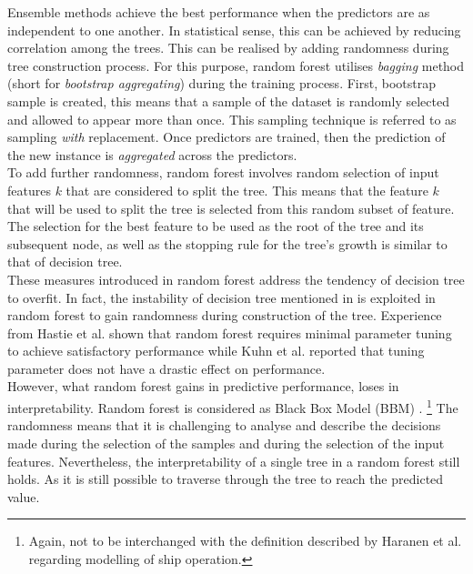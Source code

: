 Ensemble methods achieve the best performance when the predictors are as independent to one another. In statistical sense, this can be achieved by reducing correlation among the trees. This can be realised by adding randomness during tree construction process. For this purpose, random forest utilises \emph{bagging} \cite{Breiman.1996} method (short for \emph{bootstrap aggregating}) during the training process. First, bootstrap sample is created, this means that a sample of the dataset is randomly selected and allowed to appear more than once. This sampling technique is referred to as sampling \emph{with} replacement. Once predictors are trained, then the prediction of the new instance is \emph{aggregated} across the predictors. \cite{Kuhn.2013,Hastie.2009,Geron.2019}\\

To add further randomness, random forest involves random selection of input features $k$ that are considered to split the tree. This means that the feature $k$ that will be used to split the tree is selected from this random subset of feature. The selection for the best feature to be used as the root of the tree and its subsequent node, as well as the stopping rule for the tree's growth is similar to that of decision tree. \cite{Kuhn.2013,Hastie.2009,Geron.2019}\\

These measures introduced in random forest address the tendency of decision tree to overfit. In fact, the instability of decision tree mentioned in  is exploited in random forest to gain randomness during construction of the tree. Experience from Hastie et al. \cite{Hastie.2009} shown that random forest requires minimal parameter tuning to achieve satisfactory performance while Kuhn et al. \cite{Kuhn.2013} reported that tuning parameter does not have a drastic effect on performance. \\

However, what random forest gains in predictive performance, loses in interpretability. Random forest is considered as Black Box Model (BBM) \cite{Geron.2019,Affenzeller.2020}. \footnote{Again, not to be interchanged with the definition described by Haranen et al. \cite{MichaelHaranen.2016} regarding modelling of ship operation.} The randomness means that it is challenging to analyse and describe the decisions made during the selection of the samples and during the selection of the input features. Nevertheless, the interpretability of a single tree in a random forest still holds. As it is still possible to traverse through the tree to reach the predicted value.\\ 

